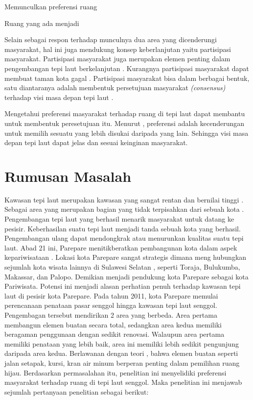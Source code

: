 \documentclass[../projects/thesis.tex]{subfiles}
\begin{document}
Memunculkan preferensi ruang

Ruang yang ada menjadi



Selain sebagai respon terhadap munculnya dua area yang dicenderungi masyarakat, hal ini juga mendukung konsep keberlanjutan yaitu partisipasi masyarakat.
Partisipasi masyarakat juga merupakan elemen penting dalam pengembangan tepi laut berkelanjutan \citep{eldeeb2015,giovinazzi2009}. Kurangnya partisipasi masyarakat dapat membuat taman kota gagal \citep{devysandra2012}. Partisipasi masyarakat bisa dalam berbagai bentuk, satu diantaranya adalah membentuk persetujuan masyarakat \textit{(consensus)} terhadap visi masa depan tepi laut \citep{nysds2009}.


Mengetahui preferensi masyarakat terhadap ruang di tepi laut dapat membantu untuk membentuk peresetujuan itu. Menurut \cite{devysandra2012}, preferensi adalah kecenderungan untuk memilih sesuatu yang lebih disukai daripada yang lain. Sehingga visi masa depan tepi laut dapat jelas dan sesuai keinginan masyarakat.


\section{Rumusan Masalah}
Kawasan tepi laut merupakan kawasan yang sangat rentan dan bernilai tinggi \citep{mullin2000}. Sebagai area yang merupakan bagian yang tidak terpisahkan dari sebuah kota \citep{hussein2014}. Pengembangan tepi laut yang berhasil menarik masyarakat untuk datang ke pesisir. Keberhasilan suatu tepi laut menjadi tanda sebuah kota yang berhasil.
Pengembangan ulang dapat mendongkrak atau menurunkan kualitas suatu tepi laut. Abad 21 ini, Parepare menitikberatkan pembangunan kota dalam aspek kepariwisataan \citep{junaid2016,faniapriani2018,muh.sainals2020} . Lokasi kota Parepare sangat strategis dimana meng­ hubungkan sejumlah kota wisata lainnya di Sulawesi Selatan \citep{junaid2016}, seperti Toraja, Bulukumba, Makassar, dan Palopo. Demikian menjadi pendukung kota Parepare sebagai kota Pariwisata. Potensi ini menjadi alasan perhatian penuh terhadap kawasan tepi laut di pesisir kota Parepare.
Pada tahun 2011, kota Parepare memulai perencanaan penataan pasar senggol hingga kawasan tepi laut senggol. Pengembagan tersebut mendirikan 2 area yang berbeda. Area pertama membangun elemen buatan secara total, sedangkan area kedua memiliki beragaman penggunaan dengan sedikit renovasi. Walaupun area pertama memiliki penataan yang lebih baik, area ini memiliki lebih sedikit pengunjung daripada area kedua. Berlawanan dengan teori \citep{campagnaro2020}, bahwa elemen buatan seperti jalan setapak, kursi, kran air minum berperan penting dalam pemilihan ruang hijau. Berdasarkan permasalahan itu, penelitian ini menyelidiki preferensi masyarakat terhadap ruang di tepi laut senggol. Maka penelitian ini menjawab sejumlah pertanyaan penelitian sebagai berikut:
\end{document}
